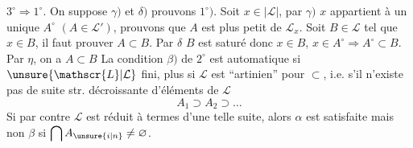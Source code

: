 $3^\circ\Rightarrow1^\circ$. \quad On suppose $\gamma)$ et $\delta)$ prouvons $1^\circ)$. Soit $x\in|\mathscr{L}|$, par $\gamma)$ $x$ appartient à un unique $A^\circ$  $(A\in\mathscr{L}')$, prouvons que $A$ est plus petit  de $\mathscr{L}_x$. Soit $B\in\mathscr{L}$ tel que $x\in B$, il faut prouver $A\subset B$.  Par $\delta$ $B$ est saturé donc $x\in B$, $x\in A^\circ\Rightarrow A^\circ\subset B$.  Par $\eta$, on a $A\subset B$
\uline{}   La condition $\beta)$ de $2^\circ$ est automatique si $\unsure{\mathscr{L}|\mathcal{L}}$ fini, plus  si $\mathscr{L}$ est ``artinien'' pour $\subset$, i.e. s'il n'existe pas de suite str. décroissante d'éléments de $\mathscr{L}$
\[
 A_1\supset A_2\supset\ldots
\]
Si par contre $\mathscr{L}$ est réduit à   termes d'une telle suite,  alors $\alpha$ est satisfaite mais non $\beta$ si $\displaystyle\bigcap A_{\unsure{i|n}}\ne\varnothing$.

